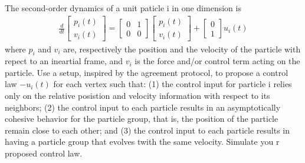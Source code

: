 \documentclass{article}
\begin{document}
\begin{problem}
    The second-order dynamics of a unit paticle i in one dimension is 
    \begin{align*}
        \frac{d}{dt} 
        \begin{bmatrix*}
            p_i(t)\\
            v_i(t)  
        \end{bmatrix*}
        = \begin{bmatrix*}
            0 & 1\\
            0 & 0 
        \end{bmatrix*}
        \begin{bmatrix*}
            p_i(t)\\
            v_i(t)  
        \end{bmatrix*}
        + 
        \begin{bmatrix*}
            0\\
            1
        \end{bmatrix*} u_i(t)
    \end{align*}
    where $p_i$ and $v_i$ are, respectively the position and the velocity of the particle with repect to an ineartial frame, and $v_i$ is the force and/or control term acting on the particle. Use a setup, inspired by the agreement protocol, to propose a control law $-u_i(t)$ for each vertex such that: (1) the control input for particle i relies only on the relative posistion and velocity information with respect to its neighbors; (2) the control input to each particle results in an asymptotically cohesive behavior for the particle group, that is, the position of the particle remain close to each other; and (3) the control input to each particle results in having a particle group that evolves twith the same velocity. Simulate you r proposed control law.

\end{problem}
\end{document}
